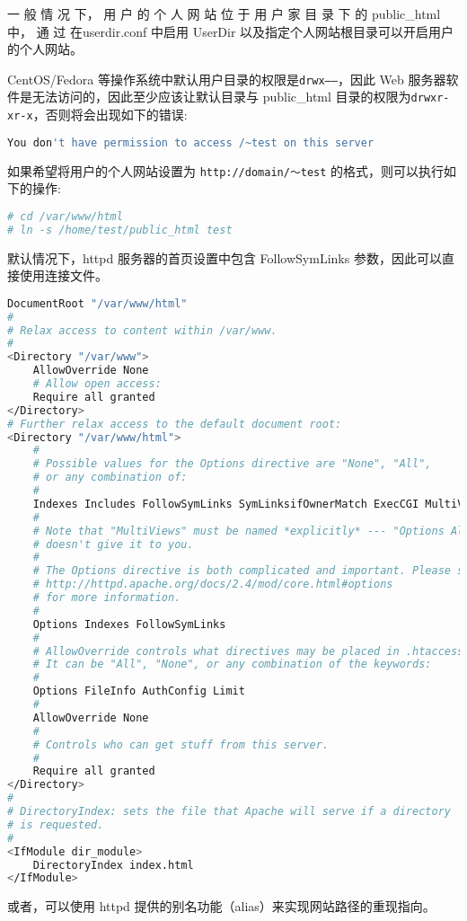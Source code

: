 一 般 情 况 下， 用 户 的 个 人 网 站 位 于 用 户 家 目 录 下 的 public\_html 中， 通 过 在userdir.conf 中启用 UserDir 以及指定个人网站根目录可以开启用户的个人网站。

CentOS/Fedora 等操作系统中默认用户目录的权限是\texttt{drwx------}，因此 Web 服务器软件是无法访问的，因此至少应该让默认目录与 public\_html 目录的权限为\texttt{drwxr-xr-x}，否则将会出现如下的错误:

\begin{lstlisting}[language=bash]
You don't have permission to access /~test on this server
\end{lstlisting}


如果希望将用户的个人网站设置为 \texttt{http://domain/～test} 的格式，则可以执行如下的操作:

\begin{lstlisting}[language=bash]
# cd /var/www/html
# ln -s /home/test/public_html test
\end{lstlisting}


默认情况下，httpd 服务器的首页设置中包含 FollowSymLinks 参数，因此可以直接使用连接文件。


\begin{lstlisting}[language=bash]
DocumentRoot "/var/www/html"
#
# Relax access to content within /var/www.
#
<Directory "/var/www">
	AllowOverride None
	# Allow open access:
	Require all granted
</Directory>
# Further relax access to the default document root:
<Directory "/var/www/html">
	#
	# Possible values for the Options directive are "None", "All",
	# or any combination of:
	#
	Indexes Includes FollowSymLinks SymLinksifOwnerMatch ExecCGI MultiViews
	#
	# Note that "MultiViews" must be named *explicitly* --- "Options All"
	# doesn't give it to you.
	#
	# The Options directive is both complicated and important. Please see
	# http://httpd.apache.org/docs/2.4/mod/core.html#options
	# for more information.
	#
	Options Indexes FollowSymLinks
	#
	# AllowOverride controls what directives may be placed in .htaccess files.
	# It can be "All", "None", or any combination of the keywords:
	#
	Options FileInfo AuthConfig Limit
	#
	AllowOverride None
	#
	# Controls who can get stuff from this server.
	#
	Require all granted
</Directory>
#
# DirectoryIndex: sets the file that Apache will serve if a directory
# is requested.
#
<IfModule dir_module>
	DirectoryIndex index.html
</IfModule>
\end{lstlisting}

或者，可以使用 httpd 提供的别名功能（alias）来实现网站路径的重现指向。

